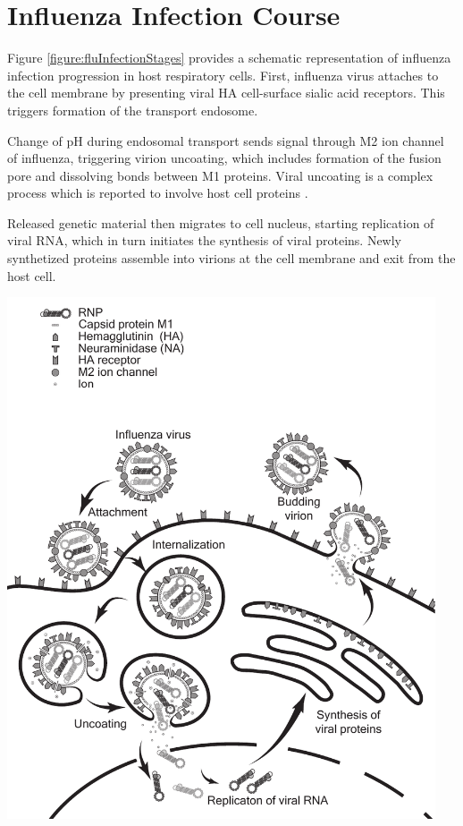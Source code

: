 \section{Influenza Infection Course}

Figure \ref{figure:fluInfectionStages} provides a schematic representation of influenza infection progression in host respiratory cells. First, influenza virus attaches to the cell membrane by presenting viral HA cell-surface sialic acid receptors. This triggers formation of the transport endosome.

Change of pH during endosomal transport sends signal through M2 ion channel of influenza, triggering virion uncoating, which includes formation of the fusion pore and dissolving bonds between M1 proteins. Viral uncoating is a complex process which is reported to involve host cell proteins \cite{banerjee2014influenza}.

Released genetic material then migrates to cell nucleus, starting replication of viral RNA, which in turn initiates the synthesis of viral proteins. Newly synthetized proteins assemble into virions at the cell membrane and exit from the host cell.

\begin{center}
\includegraphics[width=0.95\textwidth, trim={0cm 0cm 0cm 0cm}, clip]{D_chapters/0_introduction/flu_stages.pdf}
\label{figure:fluInfectionStages}
\end{center}